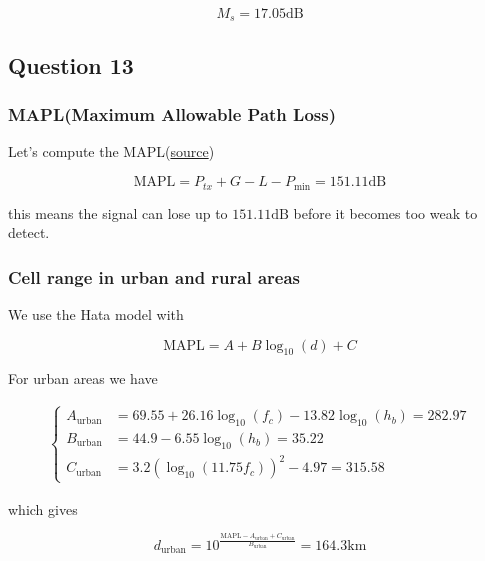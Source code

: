\documentclass[]{article}
\begin{document}
	\begin{equation}
		M_s = 17.05\text{dB}
	\end{equation}
	
	\subsection*{Question 13}
	
	\subsubsection*{MAPL(Maximum Allowable Path Loss)}
	
	Let's compute the MAPL(\href{https://wireless-systems.ece.gatech.edu/6604/2019-lectures/week2.pdf}{source})
	
	\begin{equation}
		\text{MAPL} = P_{tx} + G - L - P_{\text{min}} = 151.11\text{dB}
	\end{equation}
	
	this means the signal can lose up to $151.11\text{dB}$ before it becomes too weak to detect.

	\subsubsection*{Cell range in urban and rural areas}
	
	We use the Hata model with
	
	\begin{equation}
		\text{MAPL} = A + B\log_{10}(d) + C
	\end{equation}
	
	For urban areas we have
	
	\begin{align}
		\begin{cases}
			A_{\text{urban}} &= 69.55 + 26.16\log_{10}(f_c) - 13.82\log_{10}(h_b) = 282.97 \\
			B_{\text{urban}} &= 44.9 - 6.55\log_{10}(h_b) = 35.22 \\
			C_{\text{urban}} &= 3.2(\log_{10}(11.75f_c))^2 - 4.97 = 315.58
		\end{cases}
	\end{align}
	
	which gives
	
	\begin{equation}
		d_{\text{urban}} = 10^{\frac{\text{MAPL} - A_{\text{urban}} + C_{\text{urban}}}{B_{\text{urban}}}} = 164.3\text{km}
	\end{equation}
	
\end{document}

